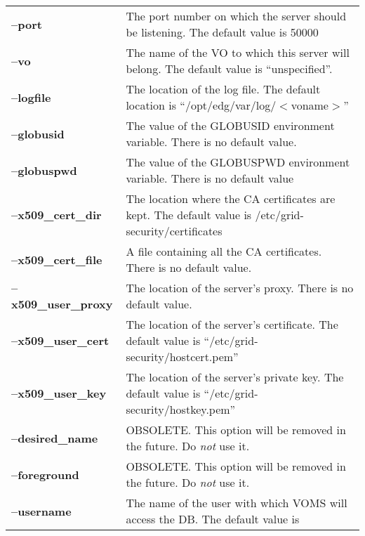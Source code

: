 \documentclass[a4paper]{book}
\begin{document}
\begin{longtable}{lp{2.9in}}
\textbf{--port}            & The port number on which the server
                             should be listening.  The default value
                             is 50000\\
\textbf{--vo}              & The name of the VO to which this server
                             will belong.  The default value is
                             ``unspecified''.\\ 
\textbf{--logfile}         & The location of the log file.  The
                             default location is
                             ``/opt/edg/var/log/$<$voname$>$''\\
\textbf{--globusid}        & The value of the GLOBUSID environment
                             variable.  There is no default value.\\ 
\textbf{--globuspwd}       & The value of the GLOBUSPWD environment
                             variable.  There is no default value\\ 
\textbf{--x509\_cert\_dir}   & The location where the CA certificates
                             are kept.  The default value is
                             /etc/grid-security/certificates\\ 
\textbf{--x509\_cert\_file}  & A file containing all the CA
                             certificates.  There is no default
                             value.\\ 
\textbf{--x509\_user\_proxy} & The location of the server's proxy.
                             There is no default value.\\
\textbf{--x509\_user\_cert}  & The location of the server's
                             certificate.  The default value is
                             ``/etc/grid-security/hostcert.pem''\\ 
\textbf{--x509\_user\_key}   & The location of the server's private
                             key.  The default value is
                             ``/etc/grid-security/hostkey.pem''\\ 
\textbf{--desired\_name}    & OBSOLETE.  This option will be removed in
                             the future.  Do \emph{not} use it.\\ 
\textbf{--foreground}      & OBSOLETE.  This option will be removed in
                             the future.  Do \emph{not} use it.\\ 
\textbf{--username}        & The name of the user with which VOMS will
                             access the DB.  The default value is

\end{longtable}
\end{document}
